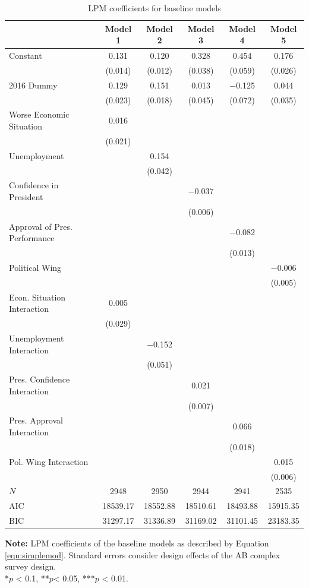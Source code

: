 \documentclass[12pt,a4]{article}\usepackage[]{graphicx}\usepackage[]{xcolor}
\begin{document}
\begin{table}[htbp]
\caption{LPM coefficients for baseline models}
\label{tab:lpmsimp}

\begin{tabular}[t]{lccccc}
\toprule
  & Model 1 & Model 2 & Model 3 & Model 4 & Model 5\\
\midrule
Constant & \num{0.131} & \num{0.120} & \num{0.328} & \num{0.454} & \num{0.176}\\
 & (\num{0.014}) & (\num{0.012}) & (\num{0.038}) & (\num{0.059}) & (\num{0.026})\\
2016 Dummy & \num{0.129} & \num{0.151} & \num{0.013} & \num{-0.125} & \num{0.044}\\
 & (\num{0.023}) & (\num{0.018}) & (\num{0.045}) & (\num{0.072}) & (\num{0.035})\\
Worse Economic Situation & \num{0.016} &  &  &  & \\
 & (\num{0.021}) &  &  &  & \\
Unemployment &  & \num{0.154} &  &  & \\
 &  & (\num{0.042}) &  &  & \\
Confidence in President &  &  & \num{-0.037} &  & \\
 &  &  & (\num{0.006}) &  & \\
Approval of Pres. Performance &  &  &  & \num{-0.082} & \\
 &  &  &  & (\num{0.013}) & \\
Political Wing &  &  &  &  & \num{-0.006}\\
 &  &  &  &  & (\num{0.005})\\
Econ. Situation Interaction & \num{0.005} &  &  &  & \\
 & (\num{0.029}) &  &  &  & \\
Unemployment Interaction &  & \num{-0.152} &  &  & \\
 &  & (\num{0.051}) &  &  & \\
Pres. Confidence Interaction &  &  & \num{0.021} &  & \\
 &  &  & (\num{0.007}) &  & \\
Pres. Approval Interaction &  &  &  & \num{0.066} & \\
 &  &  &  & (\num{0.018}) & \\
Pol. Wing Interaction &  &  &  &  & \num{0.015}\\
 &  &  &  &  & (\num{0.006})\\
\midrule
$N$ & \num{2948} & \num{2950} & \num{2944} & \num{2941} & \num{2535}\\
AIC & \num{18539.17} & \num{18552.88} & \num{18510.61} & \num{18493.88} & \num{15915.35}\\
BIC & \num{31297.17} & \num{31336.89} & \num{31169.02} & \num{31101.45} & \num{23183.35}\\
\bottomrule
\end{tabular}


\vspace{0.25cm}
\textbf{Note:} LPM coefficients of the baseline models as described by Equation \ref{eqn:simplemod}. Standard errors consider design effects of the AB complex survey design.\\
*$p$ < 0.1, **$p$< 0.05, ***$p$ < 0.01.
\end{table}
\end{document}
